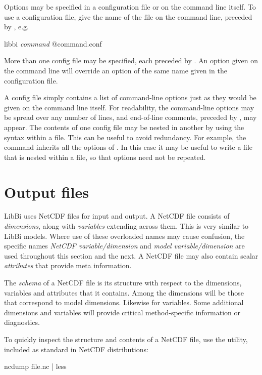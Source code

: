 Options may be specified in a configuration file or on the
command line itself. To use a configuration file, give the name of the file on
the command line, preceded by , e.g.
\begin{cmdcode}
libbi \textit{command} @command.conf
\end{cmdcode}

More than one config file may be specified, each preceded by . An
option given on the command line will override an option of the same name
given in the configuration file.

A config file simply contains a list of command-line options just as they
would be given on the command line itself. For readability, the command-line
options may be spread over any number of lines, and end-of-line comments,
preceded by \bitt{\#}, may appear. The contents of one config file may be
nested in another by using the  syntax within a file. This
can be useful to avoid redundancy. For example, the  command
inherits all the options of . In this case it may be useful
to write a  file that is nested within a 
file, so that options need not be repeated.

\section{Output files}

LibBi uses NetCDF files for input and output. A
NetCDF file consists of \emph{dimensions}, along with \emph{variables}
extending across them. This is very similar to LibBi models. Where use of
these overloaded names may cause confusion, the specific names \emph{NetCDF
  variable/dimension} and \emph{model variable/dimension} are used throughout
this section and the next. A NetCDF file may also contain scalar
\emph{attributes} that provide meta information.

The \emph{schema} of a NetCDF file is its structure with respect to the
dimensions, variables and attributes that it contains. Among the dimensions
will be those that correspond to model dimensions. Likewise for
variables. Some additional dimensions and variables will provide critical
method-specific information or diagnostics.

\begin{tip}
To quickly inspect the structure and contents of a NetCDF file, use the
 utility, included as standard in NetCDF distributions:
\begin{cmdcode}
ncdump file.nc | less
\end{cmdcode}
\end{tip}

